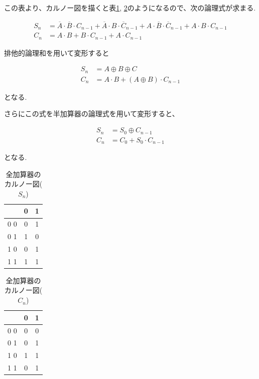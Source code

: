 \documentclass[titlepage]{jsarticle}
\theoremstyle{definition}
\begin{document}
この表より、カルノー図を描くと表\ref{zenkasan2}, \ref{zenkasan3}のようになるので、次の論理式が求まる.

\begin{align}
	S_n &= \overline{A} \cdot \overline{B} \cdot C_{n-1} + \overline{A} \cdot B \cdot \overline{C}_{n-1}
	+ A \cdot \overline{B} \cdot \overline{C}_{n-1} + A \cdot B \cdot C_{n-1} \\
	C_n &= A \cdot B + B \cdot C_{n-1} + A \cdot C_{n-1}
\end{align}

排他的論理和を用いて変形すると

\begin{align}
	S_n &= A \oplus B \oplus C \\
	C_n &= A \cdot B + (A \oplus B) \cdot C_{n-1}
\end{align}

となる.

さらにこの式を半加算器の論理式を用いて変形すると、

\begin{align}
	S_n &= S_0 \oplus C_{n-1} \\
	C_n &= C_0 + S_0 \cdot C_{n-1}
\end{align}

となる.

\begin{table}[htbp]
	\caption{全加算器のカルノー図($S_n$)}
	\label{zenkasan2}
	\centering
	\begin{tabular}{|c||c|c|} \hline
		 & 0 & 1 \\ \hline \hline
		0 0 & 0 & 1 \\ \hline
		0 1 & 1 & 0 \\ \hline
		1 0 & 0 & 1 \\ \hline
		1 1 & 1 & 1 \\ \hline
	\end{tabular}
\end{table}


\begin{table}[htbp]
	\caption{全加算器のカルノー図($C_n$)}
	\label{zenkasan3}
	\centering
	\begin{tabular}{|c||c|c|} \hline
		 & 0 & 1 \\ \hline \hline
		0 0 & 0 & 0 \\ \hline
		0 1 & 0 & 1 \\ \hline
		1 0 & 1 & 1 \\ \hline
		1 1 & 0 & 1 \\ \hline
	\end{tabular}
\end{table}
\end{document}
